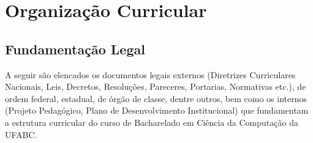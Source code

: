 \section {Organização Curricular}

\subsection{Fundamentação Legal}

A seguir são elencados os documentos legais externos (Diretrizes Curriculares Nacionais, Leis, Decretos, Resoluções, Pareceres, Portarias, Normativas etc.), de ordem federal, estadual, de órgão de classe, dentre outros, bem como os internos (Projeto Pedagógico, Plano de Desenvolvimento Institucional) que fundamentam a estrutura curricular do curso de
Bacharelado em Ciência da Computação da UFABC.

